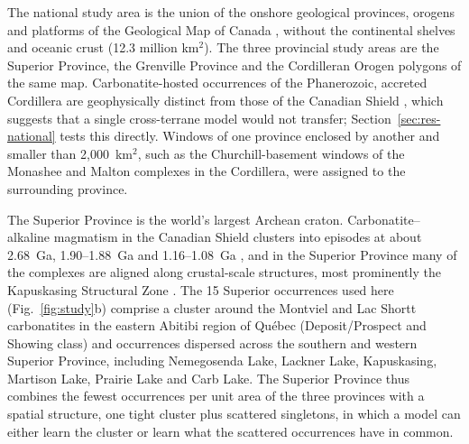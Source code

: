 \documentclass[pdflatex,sn-apa]{sn-jnl}
\begin{document}
The national study area is the union of the onshore geological provinces, orogens and platforms of the Geological Map of Canada \citep[Map 1860A;][]{Wheeler1996}, without the continental shelves and oceanic crust (12.3 million km$^2$). The three provincial study areas are the Superior Province, the Grenville Province and the Cordilleran Orogen polygons of the same map. Carbonatite-hosted occurrences of the Phanerozoic, accreted Cordillera are geophysically distinct from those of the Canadian Shield \citep{Parsa2024}, which suggests that a single cross-terrane model would not transfer; Section~\ref{sec:res-national} tests this directly. Windows of one province enclosed by another and smaller than 2,000~km$^2$, such as the Churchill-basement windows of the Monashee and Malton complexes in the Cordillera, were assigned to the surrounding province.

The Superior Province is the world's largest Archean craton. Carbonatite--alkaline magmatism in the Canadian Shield clusters into episodes at about 2.68~Ga, 1.90--1.88~Ga and 1.16--1.08~Ga \citep{Rukhlov2010}, and in the Superior Province many of the complexes are aligned along crustal-scale structures, most prominently the Kapuskasing Structural Zone \citep[KSZ;][]{Percival1994,Gittins1967}. The 15 Superior occurrences used here (Fig.~\ref{fig:study}b) comprise a cluster around the Montviel and Lac Shortt carbonatites in the eastern Abitibi region of Qu\'ebec (Deposit/Prospect and Showing class) and occurrences dispersed across the southern and western Superior Province, including Nemegosenda Lake, Lackner Lake, Kapuskasing, Martison Lake, Prairie Lake and Carb Lake. The Superior Province thus combines the fewest occurrences per unit area of the three provinces with a spatial structure, one tight cluster plus scattered singletons, in which a model can either learn the cluster or learn what the scattered occurrences have in common.
\end{document}
